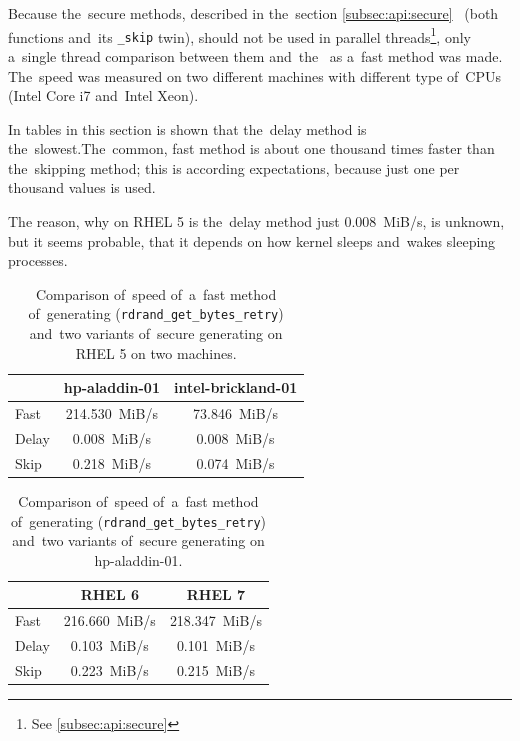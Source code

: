 \par{
Because the~secure methods, described in the~section \ref{subsec:api:secure}~ (both functions  and~its {\tt \_skip} twin), should not be used in parallel threads\footnote{See \ref{subsec:api:secure}}, only a~single thread comparison between them and~the~ as a~fast method was made. The~speed was measured on two different machines with different type of~CPUs (Intel Core i7 and~Intel Xeon).
}

\par{
In tables in this section is shown that the~delay method is the~slowest.The~common, fast method is about one thousand times faster than the~skipping method; this is according expectations, because just one per thousand values is used. 
}

\par{
The reason, why on RHEL 5 is the~delay method just 0.008~MiB/s, is unknown, but it seems probable, that it depends on how kernel sleeps and~wakes sleeping processes.
}

\begin{table}[h!]
\begin{center}
\begin{tabular}{|l|c|c|}
  \hline
   & hp-aladdin-01 & intel-brickland-01\\
  \hline
  Fast & 214.530~MiB/s & 73.846~MiB/s\\ 
  \hline
  Delay &  0.008~MiB/s & 0.008~MiB/s\\
  \hline
  Skip & 0.218~MiB/s & 0.074~MiB/s\\
  \hline
\end{tabular}
\caption{Comparison of~speed of~a~fast method of~generating ({\tt rdrand\_get\_bytes\_retry}) and~two variants of~secure generating on RHEL 5 on two machines.}
\label{tab:testing:fastAndSecure1}
\end{center}
\end{table}


\begin{table}[h!]
\begin{center}
\begin{tabular}{|l|c|c|}
  \hline
   & RHEL 6 & RHEL 7\\
  \hline
  Fast & 216.660~MiB/s & 218.347~MiB/s\\ 
  \hline
  Delay &  0.103~MiB/s & 0.101~MiB/s\\
  \hline
  Skip & 0.223~MiB/s & 0.215~MiB/s\\
  \hline
\end{tabular}
\caption{Comparison of~speed of~a~fast method of~generating ({\tt rdrand\_get\_bytes\_retry}) and~two variants of~secure generating on hp-aladdin-01.}
\label{tab:testing:fastAndSecure2}
\end{center}
\end{table}


